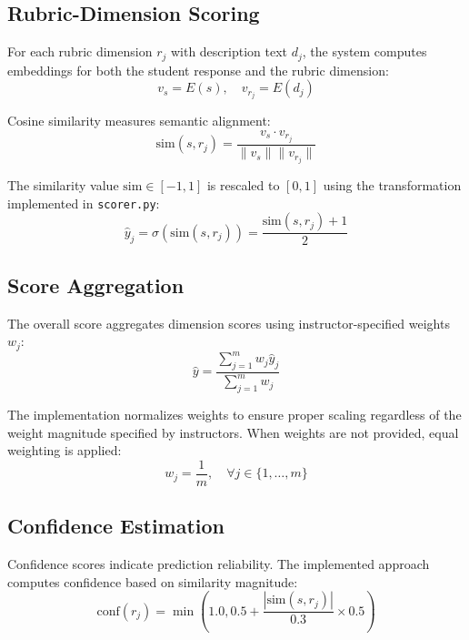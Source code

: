 \documentclass[conference]{IEEEtran}
\begin{document}
\subsection{Rubric-Dimension Scoring}
For each rubric dimension $r_j$ with description text $d_j$, the system computes embeddings for both the student response and the rubric dimension:
\begin{equation}
    v_s = E(s), \quad v_{r_j} = E(d_j)
\end{equation}

Cosine similarity measures semantic alignment:
\begin{equation}
    \text{sim}(s, r_j) = \frac{v_s \cdot v_{r_j}}{\|v_s\| \|v_{r_j}\|}
\end{equation}

The similarity value $\text{sim} \in [-1, 1]$ is rescaled to $[0, 1]$ using the transformation implemented in \texttt{scorer.py}:
\begin{equation}
    \hat{y}_j = \sigma(\text{sim}(s, r_j)) = \frac{\text{sim}(s, r_j) + 1}{2}
\end{equation}

\subsection{Score Aggregation}
The overall score aggregates dimension scores using instructor-specified weights $w_j$:
\begin{equation}
    \hat{y} = \frac{\sum_{j=1}^{m} w_j \hat{y}_j}{\sum_{j=1}^{m} w_j}
\end{equation}

The implementation normalizes weights to ensure proper scaling regardless of the weight magnitude specified by instructors. When weights are not provided, equal weighting is applied:
\begin{equation}
    w_j = \frac{1}{m}, \quad \forall j \in \{1, \ldots, m\}
\end{equation}

\subsection{Confidence Estimation}
Confidence scores indicate prediction reliability. The implemented approach computes confidence based on similarity magnitude:
\begin{equation}
    \text{conf}(r_j) = \min\left(1.0, 0.5 + \frac{|\text{sim}(s, r_j)|}{0.3} \times 0.5\right)
\end{equation}
\end{document}
